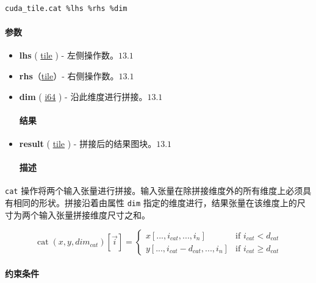\documentclass{article}
\begin{document}
\begin{lstlisting}
cuda_tile.cat %lhs %rhs %dim
\end{lstlisting}

\paragraph{参数}

\begin{itemize}
\item \textbf{lhs} ( \href{https://docs.nvidia.com/cuda/tile-ir/latest/sections/types.html#type-tile}{tile} ) - 左侧操作数。$\boxed{13.1}$
\item \textbf{rhs}（\href{https://docs.nvidia.com/cuda/tile-ir/latest/sections/types.html#type-tile}{tile}）- 右侧操作数。$\boxed{13.1}$
\item \textbf{dim} ( \href{https://docs.nvidia.com/cuda/tile-ir/latest/sections/types.html#subsection-element-types}{i64} ) - 沿此维度进行拼接。$\boxed{13.1}$


\paragraph{结果}

\item \textbf{result} ( \href{https://docs.nvidia.com/cuda/tile-ir/latest/sections/types.html#type-tile}{tile} ) - 拼接后的结果图块。$\boxed{13.1}$


\paragraph{描述}

\end{itemize}
\texttt{cat} 操作将两个输入张量进行拼接。输入张量在除拼接维度外的所有维度上必须具有相同的形状。拼接沿着由属性 \texttt{dim} 指定的维度进行，结果张量在该维度上的尺寸为两个输入张量拼接维度尺寸之和。


$$\operatorname{cat}(x, y, dim_{cat})[\vec{i}] = \begin{cases}
  x[..., i_{cat}, ..., i_n] &\text{if } i_{cat} < d_{cat} \\
  y[..., i_{cat} − d_{cat}, ..., i_n] &\text{if } i_{cat} \geq d_{cat}
\end{cases}$$

\paragraph{约束条件}
\end{document}

